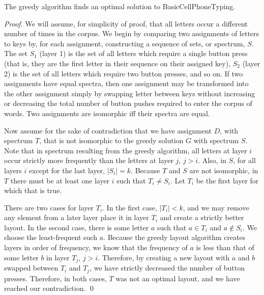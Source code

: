 \documentclass[runningheads]{llncs}
\begin{document}
\begin{theorem}
The greedy algorithm finds an optimal solution to {\sc BasicCellPhoneTyping}.
\label{basicthm}
\end{theorem}
\begin{proof}
We will assume, for simplicity of proof, that all letters occur a different
number of times in the corpus.  We begin by comparing two assignments of
letters to keys by, for each assignment, constructing a sequence of sets, or
spectrum, $S$.  The set $S_1$ (layer 1) is the set of all letters which require
a single button press (that is, they are the first letter in their sequence on
their assigned key), $S_2$ (layer 2) is the set of all letters which require
two button presses, and so on.  If two assignments have equal spectra, then one
assignment may be transformed into the other assignment simply by swapping
letter between keys without increasing or decreasing the total number of button
pushes required to enter the corpus of words.   Two assignments are isomorphic
iff their spectra are equal.

Now assume for the sake of contradiction that we have assignment $D$, with
spectrum $T$, that is not isomorphic to the greedy solution $G$ with spectrum
$S$.  Note that in spectrum resulting from the greedy algorithm, all letters at
layer $i$ occur strictly more frequently than the letters at layer $j$, $j >
i$.  Also, in $S$, for all layers $i$ except for the last layer, $|S_i| = k$.
Because $T$ and $S$ are not isomorphic, in $T$ there must be at least one layer
$i$ such that $T_i \neq S_i$.  Let $T_i$ be the first layer for which that is
true.

There are two cases for layer $T_i$.  In the first case, $|T_i| < k$, and we
may remove any element from a later layer place it in layer $T_i$ and create a
strictly better layout.  In the second case, there is some letter $a$ such that
$a \in T_i$ and $a \not\in S_i$.  We choose the least-frequent such $a$.
Because the greedy layout algorithm creates layers in order of frequency, we
know that the frequency of $a$ is less than that of some letter $b$ in layer
$T_j$, $j>i$.  Therefore, by creating a new layout with $a$ and $b$ swapped
between $T_i$ and $T_j$, we have strictly decreased the number of button
presses.  Therefore, in both cases, $T$ was not an optimal layout, and we have
reached our contradiction.  \qed \end{proof}
\end{document}
